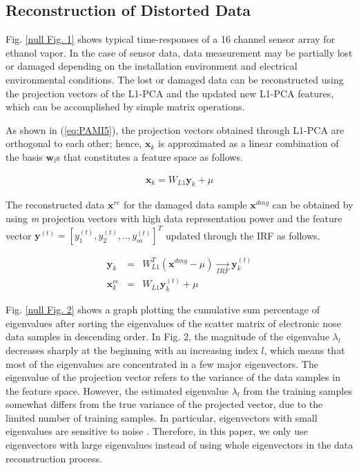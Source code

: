 \documentclass[10pt,letterpaper]{article}
\begin{document}
\subsection*{Reconstruction of Distorted Data}
Fig. \ref{null Fig. 1} shows typical time-responses of a 16 channel sensor array for ethanol vapor. In the case of sensor data, data measurement may be partially lost or damaged depending on the installation environment and electrical environmental conditions. 
The lost or damaged data can be reconstructed using the projection vectors of the L1-PCA and the updated new L1-PCA features, which can be accomplished by simple matrix operations. 

As shown in (\ref{eq:PAMI5}), the projection vectors obtained through L1-PCA are orthogonal to each other; hence, $\textbf{x}_k$ is approximated as a linear combination of the basis $\textbf{w}_{l}$s that constitutes a feature space as follows.

\begin{eqnarray}
\label{eq:sic10}
	\textbf{x}_k \mathrm{=} W_{L1}\textbf{y}_{k}+\mu
\end{eqnarray}


The reconstructed data $\textbf{x}^{re}$ for the damaged data sample $\textbf{x}^{dmg}$ can be obtained by using \textit{m} projection vectors with high data representation power and the feature vector $\textbf{y}^{(t)}=[y_{1}^{(t)},y_{2}^{(t)},..,y_{m}^{(t)}]^{T}$ updated through the IRF as follows.

\begin{eqnarray}
\label{eq:sic11}
	\mathbf{y}_k &=& W_{L1}^T(\textbf{x}^{dmg}-\mu) \underset{IRF}{\longrightarrow} \textbf{y}_{k}^{(t)} \nonumber\\\textbf{x}^{re}_{k}&=&W_{L1}\mathbf{y}_{k}^{(t)}+\mu
\end{eqnarray} 



Fig. \ref{null Fig. 2} shows a graph plotting the cumulative sum percentage of eigenvalues after sorting the eigenvalues of the scatter matrix of electronic nose data samples in descending order. 
In Fig. 2, the magnitude of the eigenvalue $\lambda_l$ decreases sharply at the beginning with an increasing index $l$, which means that most of the eigenvalues are concentrated in a few major eigenvectors. 
The eigenvalue of the projection vector refers to the variance of the data samples in the feature space. 
However, the estimated eigenvalue $\lambda_l$ from the training samples somewhat differs from the true variance of the projected vector, due to the limited number of training samples. 
In particular, eigenvectors with small eigenvalues are sensitive to noise \cite{martinez1998ar}. 
Therefore, in this paper, we only use eigenvectors with large eigenvalues instead of using whole eigenvectors in the data reconstruction process.
\end{document}
